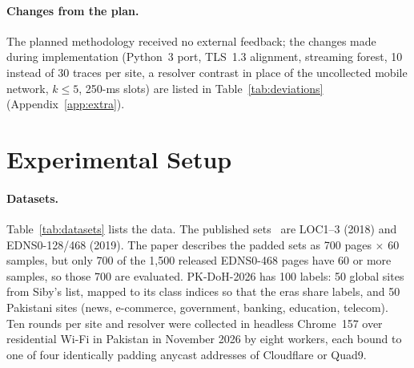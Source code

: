 \documentclass[pdflatex,sn-mathphys-num]{sn-jnl}
\begin{document}
\paragraph{Changes from the plan.} The planned methodology received no external feedback; the changes made during implementation (Python~3 port, TLS~1.3 alignment, streaming forest, 10 instead of 30 traces per site, a resolver contrast in place of the uncollected mobile network, $k\le5$, 250-ms slots) are listed in Table~\ref{tab:deviations} (Appendix~\ref{app:extra}).

\section{Experimental Setup}\label{sec:setup}

\paragraph{Datasets.} Table~\ref{tab:datasets} lists the data. The published sets~\cite{siby2020,sibycode} are LOC1--3 (2018) and EDNS0-128/468 (2019). The paper describes the padded sets as 700 pages $\times$ 60 samples, but only 700 of the 1,500 released EDNS0-468 pages have 60 or more samples, so those 700 are evaluated. PK-DoH-2026 has 100 labels: 50 global sites from Siby's list, mapped to its class indices so that the eras share labels, and 50 Pakistani sites (news, e-commerce, government, banking, education, telecom). Ten rounds per site and resolver were collected in headless Chrome~157 over residential Wi-Fi in Pakistan in November 2026 by eight workers, each bound to one of four identically padding anycast addresses of Cloudflare or Quad9.
\end{document}
